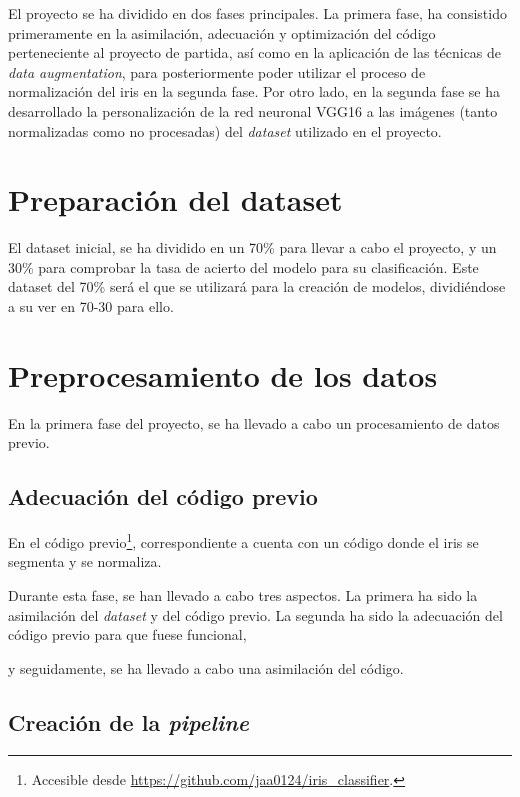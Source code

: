  \label{capitulo5}

El proyecto se ha dividido en dos fases principales. La primera fase, ha consistido primeramente en la asimilación, adecuación y optimización del código perteneciente
al proyecto de partida\cite{tfg_iris_2020}, así como en la aplicación de las técnicas de \textit{data augmentation}, para posteriormente poder utilizar el proceso de normalización del iris en la segunda fase. 
Por otro lado, en la segunda fase se ha desarrollado la personalización de la red neuronal VGG16 a las imágenes (tanto normalizadas como no procesadas) del \textit{dataset} utilizado en el proyecto.


\section{Preparación del dataset}

El dataset inicial, se ha dividido en un 70\% para llevar a cabo el proyecto, y un 30\% para comprobar la tasa de acierto del modelo para su clasificación. 
Este dataset del 70\% será el que se utilizará para la creación de modelos, dividiéndose a su ver en 70-30 para ello. 

\section{Preprocesamiento de los datos}

En la primera fase del proyecto, se ha llevado a cabo un procesamiento de datos previo.

\subsection{Adecuación del código previo}

En el código previo\footnote{Accesible desde \url{https://github.com/jaa0124/iris_classifier}.}, correspondiente a \cite{tfg_iris_2020} cuenta con un código donde el iris se segmenta y se normaliza.

Durante esta fase, se han llevado a cabo tres aspectos. La primera ha sido la asimilación del \textit{dataset} y del código previo. La segunda ha sido la adecuación del código previo para que fuese funcional,

y seguidamente, se ha llevado a cabo una asimilación del código. 

\subsection{Creación de la \textit{pipeline}}

